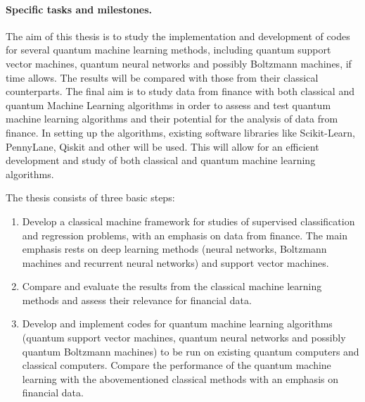 \documentclass[%
oneside,                 %
final,                   %
10pt]{article}
\begin{document}
\paragraph{Specific tasks and milestones.}

The aim of this thesis is to study the implementation and development
of codes for several quantum machine learning methods, including
quantum support vector machines, quantum neural networks and possibly
Boltzmann machines, if time allows. The results will be compared with
those from their classical counterparts.  The final aim is to study
data from finance with both classical and quantum Machine Learning
algorithms in order to assess and test quantum machine learning
algorithms and their potential for the analysis of data from finance.
In setting up the algorithms, existing software libraries like
Scikit-Learn, PennyLane, Qiskit and other will be used. This will
allow for an efficient development and study of both classical and
quantum machine learning algorithms.

The thesis consists of three basic steps:

\begin{enumerate}
\item Develop a classical machine framework for studies of supervised classification and regression problems, with an emphasis on data from finance. The main emphasis rests on deep learning methods (neural networks, Boltzmann machines and recurrent neural networks) and support vector machines.

\item Compare and evaluate the results from the classical machine learning methods and assess their relevance for financial data.

\item Develop and implement  codes for quantum machine learning algorithms (quantum support vector machines, quantum neural networks and possibly quantum Boltzmann machines) to be run on existing quantum computers and classical computers. Compare the performance of the quantum machine learning  with the abovementioned classical methods with an emphasis on  financial data.
\end{enumerate}
\end{document}

